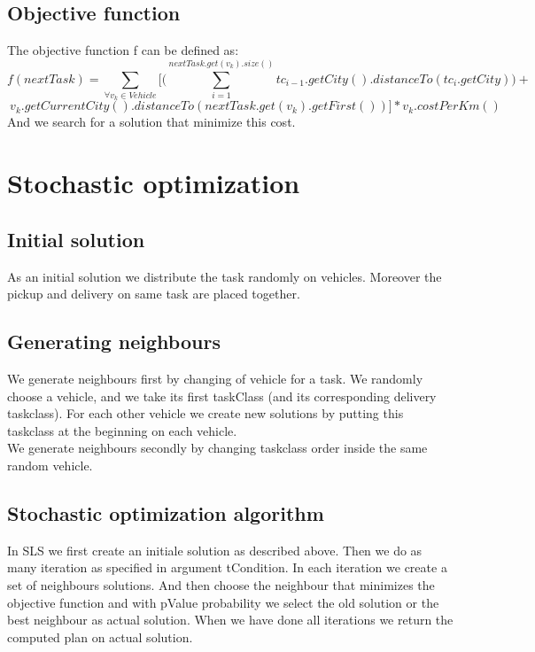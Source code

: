 \documentclass[10.5pt]{article}
\begin{document}
\subsection{Objective function}
The objective function f can be defined as:
\[f(nextTask) = \sum_{\forall v_k \in Vehicle} \bigg[ \bigg( \sum_{i=1}^{nextTask.get(v_k).size()} tc_{i-1}.getCity().distanceTo(tc_i.getCity) \bigg) + \]
\[ \ v_k.getCurrentCity().distanceTo(nextTask.get(v_k).getFirst()) \bigg]*v_k.costPerKm() \]
And we search for a solution that minimize this cost. 

\section{Stochastic optimization}

\subsection{Initial solution}
As an initial solution we distribute the task randomly on vehicles.
Moreover the pickup and delivery on same task are placed together.

\subsection{Generating neighbours}
We generate neighbours first by changing of vehicle for a task.
We randomly choose a vehicle, and we take its first taskClass (and its corresponding delivery taskclass).
For each other vehicle we create new solutions by putting this taskclass at the beginning on each vehicle.\\
We generate neighbours secondly by changing taskclass order inside the same random vehicle.


\subsection{Stochastic optimization algorithm}
In SLS we first create an initiale solution as described above. Then we do as many iteration as specified in argument tCondition.
In each iteration we create a set of neighbours solutions. And then choose the neighbour that minimizes the objective function and with pValue probability we select the old solution or the best neighbour as actual solution.
When we have done all iterations we return the computed plan on actual solution. 
\end{document}
